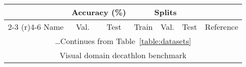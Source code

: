 \documentclass{article} \usepackage{iclr2023_conference,times}
\begin{document}
\begin{table*}[h]
\small
\caption{Datasets details (part 2 of 3).}
\label{table:datasets2}
\centering
\setlength\tabcolsep{1pt}
\hspace*{-9.82pt}
\begin{tabular}{lcccccc}
    \toprule
    & \multicolumn{2}{c}{Accuracy (\%)}
    & \multicolumn{3}{c}{Splits}                   \\
    \cmidrule(r){2-3}
    \cmidrule(r){4-6}
    Name & Val. & Test & Train & Val. & Test  & Reference\\
    \midrule
\multicolumn{7}{c}{\dots Continues from Table~\ref{table:datasets} }\\
\midrule

\multicolumn{7}{c}{Visual domain decathlon benchmark} \\


\end{tabular}
\end{table*}
\end{document}
